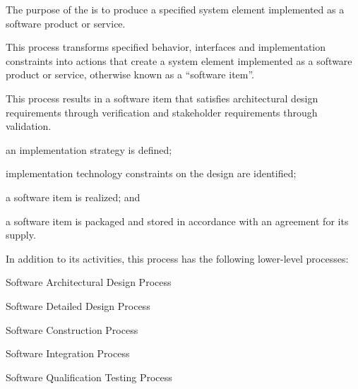 			\begin{adjustwidth}{2em}{0pt} 

				The purpose of the  is to produce a specified system element implemented as a software product or service.

				This process transforms specified behavior, interfaces and implementation constraints into actions that create a system element implemented as a software product or service, otherwise known as a ``software item''. 

				This process results in a software item that satisfies architectural design requirements through verification and stakeholder requirements through validation.

			\end{adjustwidth}

			\begin{adjustwidth}{2em}{0pt} 

				\begin{compactitem}

					\item an implementation strategy is defined;

					\item implementation technology constraints on the design are identified;

					\item a software item is realized; and

					\item a software item is packaged and stored in accordance with an agreement for its supply.

					\item In addition to its activities, this process has the following lower-level processes:

					\begin{compactenum}

						\item Software Architectural Design Process

						\item Software Detailed Design Process

						\item Software Construction Process

						\item Software Integration Process

						\item Software Qualification Testing Process

					\end{compactenum}

				\end{compactitem}

			\end{adjustwidth}

